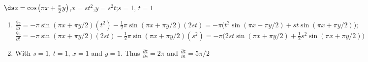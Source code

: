 {$\ds z=\cos\left(\pi x+\frac{\pi}2y\right)$,\quad $x=st^2$,\quad $y=s^2t$;\quad $s=1$, $t=1$
}
{\begin{enumerate}
	\item $\frac{\partial z}{\partial s} = -\pi\sin(\pi x+\pi y/2)(t^2) -\frac12\pi\sin(\pi x+\pi y/2)(2st) = -\pi\Big(t^2\sin(\pi x+ \pi y/2) + st\sin(\pi x+\pi y/2)\Big)$;\\
	$\frac{\partial z}{\partial t} = -\pi\sin(\pi x+\pi y/2)(2st) -\frac12\pi\sin(\pi x+\pi y/2)(s^2)= -\pi\Big(2st\sin(\pi x+\pi y/2) + \frac12s^2\sin(\pi x+\pi y/2)\Big)$
	
	\item		With $s=1$, $t=1$, $x=1$ and $y=1$. Thus $\frac{\partial z}{\partial s} = 2\pi$ and $\frac{\partial z}{\partial t} = 5\pi/2$
\end{enumerate}
}
